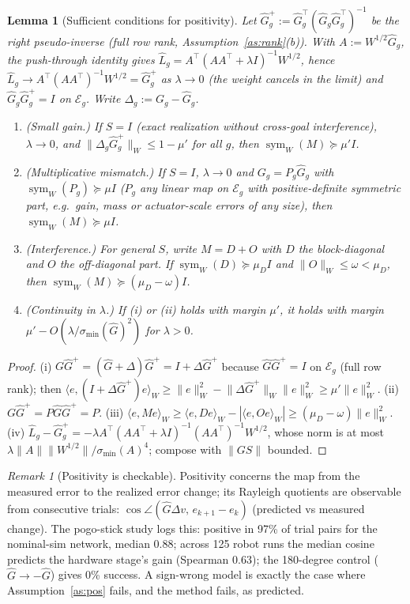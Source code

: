\documentclass[11pt]{article}
\newtheorem{lemma}[theorem]{Lemma}
\theoremstyle{definition}
\theoremstyle{remark}
\newtheorem{remark}[theorem]{Remark}
\newcommand{\cE}{\mathcal{E}}
\newcommand{\ip}[2]{\langle #1,#2\rangle_W}
\newcommand{\nW}[1]{\lVert #1\rVert_W}
\newcommand{\n}[1]{\lVert #1\rVert}
\newcommand{\symW}{\operatorname{sym}_W}
\newcommand{\Ghat}{\widehat G}
\newcommand{\Lhat}{\widehat L}
\begin{document}
\begin{lemma}[Sufficient conditions for positivity]\label{lem:suff}
Let $\Ghat_g^+:=\Ghat_g^\top(\Ghat_g\Ghat_g^\top)^{-1}$ be the right pseudo-inverse (full row rank,
Assumption~\ref{as:rank}(b)). With $A:=W^{1/2}\Ghat_g$, the push-through identity gives
$\Lhat_g=A^\top(AA^\top+\lambda I)^{-1}W^{1/2}$, hence $\Lhat_g\to A^\top(AA^\top)^{-1}W^{1/2}=\Ghat_g^+$ as
$\lambda\to0$ (the weight cancels in the limit) and $\Ghat_g\Ghat_g^+=I$ on $\cE_g$. Write $\Delta_g:=G_g-\Ghat_g$.
\begin{enumerate}[label=(\roman*)]
\item \emph{(Small gain.)} If $S=I$ (exact realization without cross-goal interference), $\lambda\to0$, and
  $\n{\Delta_g\Ghat_g^+}_W\le1-\mu'$ for all $g$, then $\symW(M)\succeq\mu' I$.
\item \emph{(Multiplicative mismatch.)} If $S=I$, $\lambda\to0$ and $G_g=P_g\Ghat_g$ with $\symW(P_g)\succeq\mu I$
  ($P_g$ any linear map on $\cE_g$ with positive-definite symmetric part, e.g.\ gain, mass or actuator-scale errors of
  any size), then $\symW(M)\succeq\mu I$.
\item \emph{(Interference.)} For general $S$, write $M=D+O$ with $D$ the block-diagonal and $O$ the off-diagonal part.
  If $\symW(D)\succeq\mu_D I$ and $\n{O}_W\le\omega<\mu_D$, then $\symW(M)\succeq(\mu_D-\omega)I$.
\item \emph{(Continuity in $\lambda$.)} If (i) or (ii) holds with margin $\mu'$, it holds with margin
  $\mu'-O(\lambda/\sigma_{\min}(\Ghat)^2)$ for $\lambda>0$.
\end{enumerate}
\end{lemma}
\begin{proof}
(i) $G\Ghat^+=(\Ghat+\Delta)\Ghat^+=I+\Delta\Ghat^+$ because $\Ghat\Ghat^+=I$ on $\cE_g$ (full row rank); then
$\ip{e}{(I+\Delta\Ghat^+)e}\ge\nW{e}^2-\n{\Delta\Ghat^+}_W\nW{e}^2\ge\mu'\nW{e}^2$.
(ii) $G\Ghat^+=P\Ghat\Ghat^+=P$. (iii) $\ip{e}{Me}\ge\ip{e}{De}-|\ip{e}{Oe}|\ge(\mu_D-\omega)\nW{e}^2$.
(iv) $\Lhat_g-\Ghat_g^+=-\lambda A^\top(AA^\top+\lambda I)^{-1}(AA^\top)^{-1}W^{1/2}$, whose norm is at most
$\lambda\n{A}\n{W^{1/2}}/\sigma_{\min}(A)^{4}$; compose with $\n{GS}$ bounded.
\end{proof}
\begin{remark}[Positivity is checkable]
Positivity concerns the map from the measured error to the realized error change; its Rayleigh quotients are observable
from consecutive trials: $\cos\angle(\Ghat\Delta v,\,e_{k+1}-e_k)$ (predicted vs measured change). The pogo-stick study
logs this: positive in 97\% of trial pairs for the nominal-sim network, median 0.88; across 125 robot runs the median
cosine predicts the hardware stage's gain (Spearman 0.63); the 180-degree control ($\Ghat\to-\Ghat$) gives 0\% success.
A sign-wrong model is exactly the case where Assumption~\ref{as:pos} fails, and the method fails, as predicted.
\end{remark}
\end{document}
